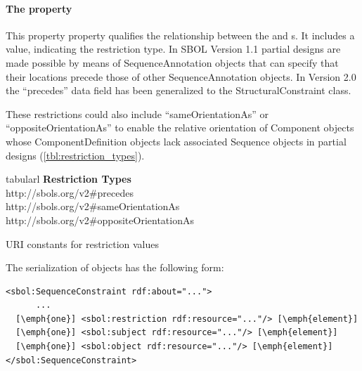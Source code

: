 \paragraph{The  property}
\label{sec:restriction}

This property property qualifies the relationship between the  and  s. It includes a  value, indicating the restriction type. In SBOL Version 1.1 partial designs are made possible by means of SequenceAnnotation objects that can specify that their locations precede those of other SequenceAnnotation objects. In Version 2.0 the ``precedes'' data field has been generalized to the StructuralConstraint class. 

These restrictions could also include ``sameOrientationAs'' or ``oppositeOrientationAs'' to enable the relative orientation of Component objects whose ComponentDefinition objects lack associated Sequence objects in partial designs (\ref{tbl:restriction_types}).

\begin{table}[ht]
  \begin{edtable}{tabular}{l}
    \toprule
    \textbf{Restriction Types}  \\
    \midrule
    http://sbols.org/v2\#precedes\\
    http://sbols.org/v2\#sameOrientationAs\\
    http://sbols.org/v2\#oppositeOrientationAs\\    
    \bottomrule
  \end{edtable}
  \caption{URI constants for restriction values}
  \label{tbl:restriction_types}
\end{table}




The serialization of  objects has the following form:
\begin{lstlisting}
<sbol:SequenceConstraint rdf:about="...">
      ...
  [\emph{one}] <sbol:restriction rdf:resource="..."/> [\emph{element}]
  [\emph{one}] <sbol:subject rdf:resource="..."/> [\emph{element}]
  [\emph{one}] <sbol:object rdf:resource="..."/> [\emph{element}]
</sbol:SequenceConstraint>
\end{lstlisting}

